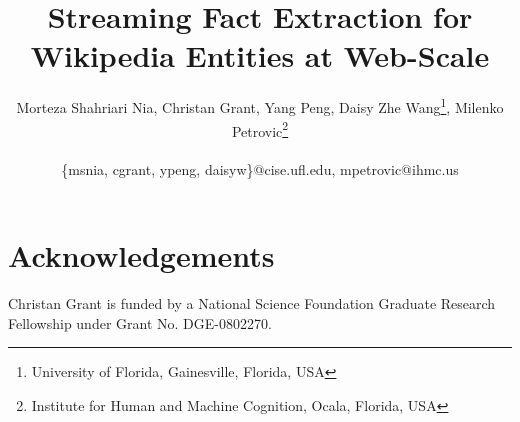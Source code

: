 \documentclass[letterpaper]{article}
\newcommand\hide[2]{#2}
\begin{document}
\title{Streaming Fact Extraction for Wikipedia Entities at Web-Scale}





\author{Morteza Shahriari Nia, Christan Grant, Yang Peng, Daisy Zhe Wang\footnote{University of Florida, Gainesville, Florida, USA}, Milenko Petrovic\footnote{Institute for Human and Machine Cognition, Ocala, Florida, USA}\\
       \\
       {\{msnia, cgrant, ypeng, daisyw\}@cise.ufl.edu,}
       {mpetrovic@ihmc.us}
}



\maketitle







%







\section*{Acknowledgements}

Christan Grant is funded by a National Science Foundation Graduate Research Fellowship under Grant No. DGE-0802270. 


%
%




%
\end{document}
